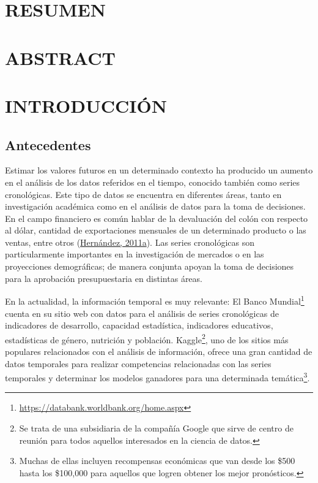 \documentclass[
]{article}
\begin{document}
\cleardoublepage

\tableofcontents
\listoftables
\listoffigures

\cleardoublepage
{}

\newpage

\section*{RESUMEN}

\cleardoublepage

\section*{ABSTRACT}

\cleardoublepage

\section{INTRODUCCIÓN}

\subsection{Antecedentes}

Estimar los valores futuros en un determinado contexto ha producido un
aumento en el análisis de los datos referidos en el tiempo, conocido
también como series cronológicas. Este tipo de datos se encuentra en
diferentes áreas, tanto en investigación académica como en el análisis
de datos para la toma de decisiones. En el campo financiero es común
hablar de la devaluación del colón con respecto al dólar, cantidad de
exportaciones mensuales de un determinado producto o las ventas, entre
otros (\protect\hyperlink{ref-oscarh-1}{Hernández, 2011a}). Las series
cronológicas son particularmente importantes en la investigación de
mercados o en las proyecciones demográficas; de manera conjunta apoyan
la toma de decisiones para la aprobación presupuestaria en distintas
áreas.

En la actualidad, la información temporal es muy relevante: El Banco
Mundial\footnote{\url{https://databank.worldbank.org/home.aspx}} cuenta
en su sitio web con datos para el análisis de series cronológicas de
indicadores de desarrollo, capacidad estadística, indicadores
educativos, estadísticas de género, nutrición y población.
Kaggle\footnote{Se trata de una subsidiaria de la compañía Google que
  sirve de centro de reunión para todos aquellos interesados en la
  ciencia de datos.}, uno de los sitios más populares relacionados con
el análisis de información, ofrece una gran cantidad de datos temporales
para realizar competencias relacionadas con las series temporales y
determinar los modelos ganadores para una determinada
temática\footnote{Muchas de ellas incluyen recompensas económicas que
  van desde los \$500 hasta los \$100,000 para aquellos que logren
  obtener los mejor pronósticos.}.
\end{document}

